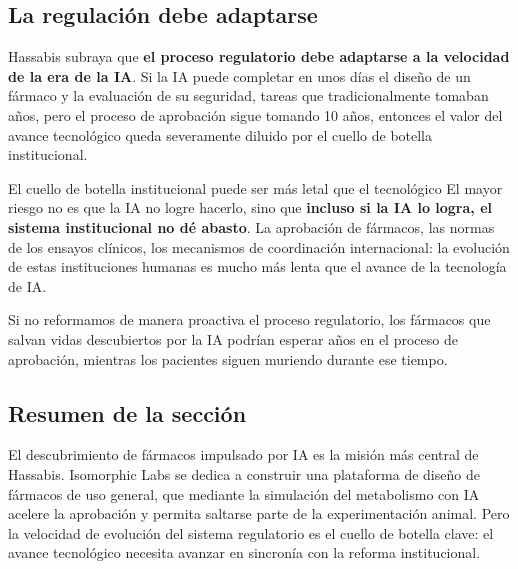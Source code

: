 \subsection{La regulación debe adaptarse}

Hassabis subraya que \textbf{el proceso regulatorio debe adaptarse a la velocidad de la era de la IA}. Si la IA puede completar en unos días el diseño de un fármaco y la evaluación de su seguridad, tareas que tradicionalmente tomaban años, pero el proceso de aprobación sigue tomando 10 años, entonces el valor del avance tecnológico queda severamente diluido por el cuello de botella institucional.

\begin{warningbox}{El cuello de botella institucional puede ser más letal que el tecnológico}
El mayor riesgo no es que la IA no logre hacerlo, sino que \textbf{incluso si la IA lo logra, el sistema institucional no dé abasto}. La aprobación de fármacos, las normas de los ensayos clínicos, los mecanismos de coordinación internacional: la evolución de estas instituciones humanas es mucho más lenta que el avance de la tecnología de IA.

Si no reformamos de manera proactiva el proceso regulatorio, los fármacos que salvan vidas descubiertos por la IA podrían esperar años en el proceso de aprobación, mientras los pacientes siguen muriendo durante ese tiempo.
\end{warningbox}

\subsection{Resumen de la sección}

El descubrimiento de fármacos impulsado por IA es la misión más central de Hassabis. Isomorphic Labs se dedica a construir una plataforma de diseño de fármacos de uso general, que mediante la simulación del metabolismo con IA acelere la aprobación y permita saltarse parte de la experimentación animal. Pero la velocidad de evolución del sistema regulatorio es el cuello de botella clave: el avance tecnológico necesita avanzar en sincronía con la reforma institucional.

